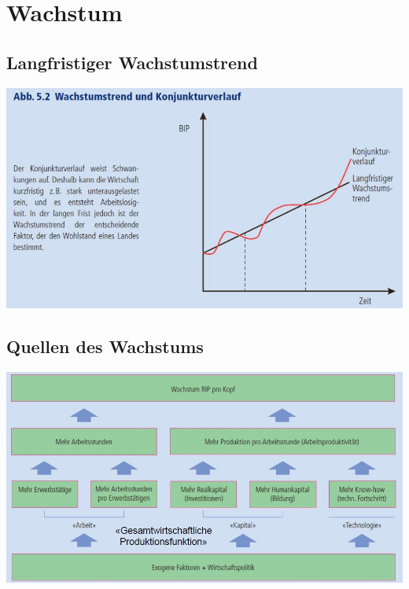\section{Wachstum}
\subsection{Langfristiger Wachstumstrend}
\includegraphics[width=0.7\linewidth]{images/wachstum.jpg}
\subsection{Quellen des Wachstums}
\includegraphics[width=0.7\linewidth]{images/quellen.jpg}
